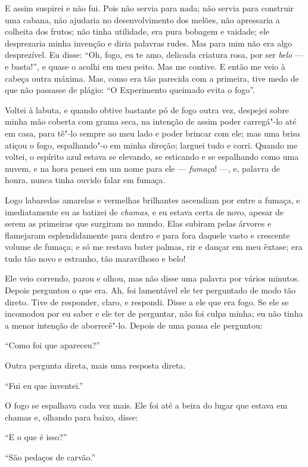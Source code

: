 E assim suspirei e não fui. Pois não servia para nada; não servia para construir
uma cabana, não ajudaria no desenvolvimento dos melões, não apressaria a
colheita dos frutos; não tinha utilidade, era pura bobagem e vaidade; ele
desprezaria minha invenção e diria palavras rudes. Mas para mim não era algo
desprezível. Eu disse: “Oh, fogo, eu te amo, delicada criatura rosa, por
ser \textit{belo} --- e basta!”, e quase o acolhi em meu peito. Mas me contive. E então
me veio à cabeça outra máxima. Mas, como era tão parecida com a
primeira, tive medo de que não passasse de plágio: “O Experimento queimado evita o
fogo”.

Voltei à labuta, e quando obtive bastante pó de fogo outra
vez, despejei sobre minha mão coberta com grama seca, na intenção de assim
poder carregá"-lo até em casa, para tê"-lo sempre ao meu lado e poder brincar com ele; 
mas uma brisa atiçou o fogo, espalhando"-o em minha direção; larguei tudo e corri.
Quando me voltei, o espírito azul estava se elevando, se esticando e se
espalhando como uma nuvem, e na hora pensei em um nome para ele ---
\textit{fumaça}! ---, e, palavra de honra, nunca tinha ouvido falar em fumaça.

Logo labaredas amarelas e vermelhas brilhantes ascendiam por entre a fumaça, e
imediatamente eu as batizei de \textit{chamas}, e eu estava certa de novo, apesar
de serem as primeiras que surgiram no mundo. Elas subiram pelas árvores e
flamejaram esplendidamente para dentro e para fora daquele vasto e crescente 
volume de fumaça; e só me restava bater palmas, rir e dançar em meu êxtase; era tudo
tão novo e estranho, tão maravilhoso e belo!

Ele veio correndo, parou e olhou, mas não disse uma palavra por vários minutos. Depois
perguntou o que era. Ah, foi lamentável ele ter perguntado de modo
tão direto. Tive de responder, claro, e respondi. Disse a ele que
era fogo. Se ele se incomodou por eu saber e ele ter de perguntar, não foi
culpa minha; eu não tinha a menor intenção de aborrecê"-lo. Depois de uma pausa
ele perguntou:

“Como foi que apareceu?”

Outra pergunta direta, mais uma resposta direta.

“Fui eu que inventei.”

O fogo se espalhava cada vez mais. Ele foi até a beira do lugar
que estava em chamas e, olhando para baixo, disse:

“E o que é isso?”

“São pedaços de carvão.”

